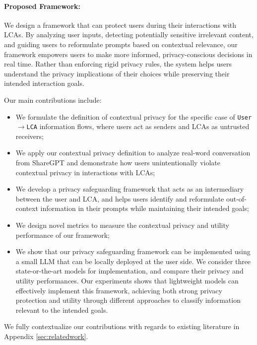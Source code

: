 \paragraph{Proposed Framework:} We design a framework that can protect users during their interactions with LCAs. By analyzing user inputs, detecting potentially sensitive irrelevant content, and guiding users to reformulate prompts based on contextual relevance, our framework empowers users to make more informed, privacy-conscious decisions in real time. Rather than enforcing rigid privacy rules, the system helps users understand the privacy implications of their choices while preserving their intended interaction goals. 


Our main contributions include:
\begin{itemize}[leftmargin=1em]
\setlength{\itemsep}{-2pt} 
    \item We formulate the definition of contextual privacy for the specific case of \texttt{User}$\rightarrow$\texttt{LCA} information flows, where users act as senders and LCAs as untrusted receivers;
    \item We apply our contextual privacy definition to analyze real-word conversation from ShareGPT \cite{vicuna2023} and demonstrate how users unintentionally violate contextual privacy in interactions with LCAs;
    \item We develop a privacy safeguarding framework that acts as an intermediary between the user and LCA, and helps users identify and reformulate out-of-context information in their prompts while maintaining their intended goals;
    \item We design novel metrics to measure the contextual privacy and utility performance of our framework;
    \item We show that our privacy safeguarding framework can be implemented using a small LLM that can be locally deployed at the user side. We consider three state-or-the-art models for implementation, and compare their privacy and utility performances. Our experiments shows that lightweight models can effectively implement this framework, achieving both strong privacy protection and utility  through different approaches to classify information relevant to the intended goals.
\end{itemize}


We fully contextualize our contributions with regards to existing literature in Appendix \ref{sec:relatedwork}.





